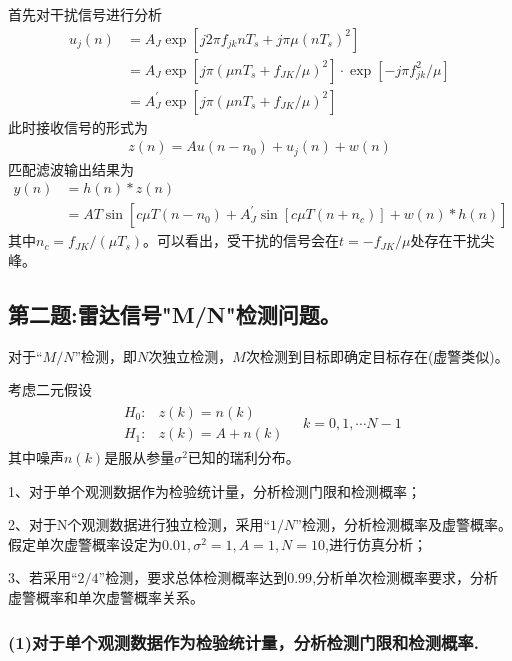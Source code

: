 \documentclass[fontset=windows]{article}
\numberwithin{figure}{section}
\begin{document}
首先对干扰信号进行分析
\begin{align*}
	u_j(n)
	 & =A_J\exp\left[j2\pi f_{jk}nT_s+j\pi \mu (nT_s)^2\right]                                    \\
	 & =A_J\exp\left[j\pi (\mu nT_s+f_{JK}/\mu)^2\right]\cdot \exp\left[-j\pi f_{jk}^2/\mu\right] \\
	 & =A_J^{\prime}\exp\left[j\pi (\mu nT_s+f_{JK}/\mu)^2\right]
\end{align*}
此时接收信号的形式为
\begin{align*}
	z(n)=Au(n-n_0)+u_j(n)+w(n)
\end{align*}
匹配滤波输出结果为
\begin{align*}
	y(n)
	 & =h(n)*z(n)                                                                               \\
	 & =AT\sin\left[c\mu T(n-n_0)+A_J^{\prime}\sin \left[c\mu T (n+n_c)\right]+w(n)*h(n)\right]
\end{align*}
其中\(n_c=f_{JK}/(\mu T_s)\)。可以看出，受干扰的信号会在\(t=-f_{JK}/\mu\)处存在干扰尖峰。

\subsection{第二题:雷达信号"M/N"检测问题。}

对于“\(M/N\)”检测，即\(N\)次独立检测，\(M\)次检测到目标即确定目标存在(虚警类似)。

考虑二元假设
\begin{align*}
	\begin{matrix}
		H_0: & z(k)=n(k)   \\
		H_1: & z(k)=A+n(k)
	\end{matrix}\quad k=0,1,\cdots N-1
\end{align*}
其中噪声\(n(k)\)是服从参量\(\sigma^2\)已知的瑞利分布。

1、对于单个观测数据作为检验统计量，分析检测门限和检测概率；

2、对于N个观测数据进行独立检测，采用“\(1/N\)”检测，分析检测概率及虚警概率。假定单次虚警概率设定为\(0.01,\sigma^2=1,A=1,N=10\),进行仿真分析；

3、若采用“\(2/4\)”检测，要求总体检测概率达到\(0.99\),分析单次检测概率要求，分析虚警概率和单次虚警概率关系。

\subsubsection*{(1)对于单个观测数据作为检验统计量，分析检测门限和检测概率.}
\end{document}
